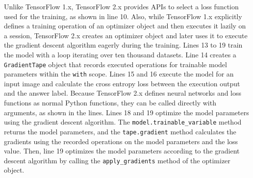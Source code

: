 Unlike TensorFlow 1.x, TensorFlow 2.x provides APIs to select a loss function
used for the training, as shown in line 10.
Also, while TensorFlow 1.x explicitly defines a training operation of an
optimizer object and then executes it lazily on a session, TensorFlow 2.x
creates an optimizer object and later uses it to execute the
gradient descent algorithm eagerly during the training.
Lines 13 to 19 train the model with a loop iterating over ten
thousand datasets.
Line 14 creates a {\tt GradientTape} object that records executed
operations for trainable model parameters within the {\tt with} scope.  
Lines 15 and 16 execute the model for an input image and calculate
the cross entropy loss between the execution output and the answer label. 
Because TensorFlow 2.x defines neural networks and loss functions as normal
Python functions, they can be called directly with arguments, as shown in the
lines.
Lines 18 and 19 optimize the model parameters using the gradient descent
algorithm. 
The {\tt model.trainable\_variable} method returns the model parameters, and
the {\tt tape.gradient} method calculates the gradients using the recorded
operations on the model parameters and the loss value.
Then, line 19 optimizes the model parameters according to the
gradient descent algorithm by calling the {\tt apply\_gradients} method of the
optimizer object.

